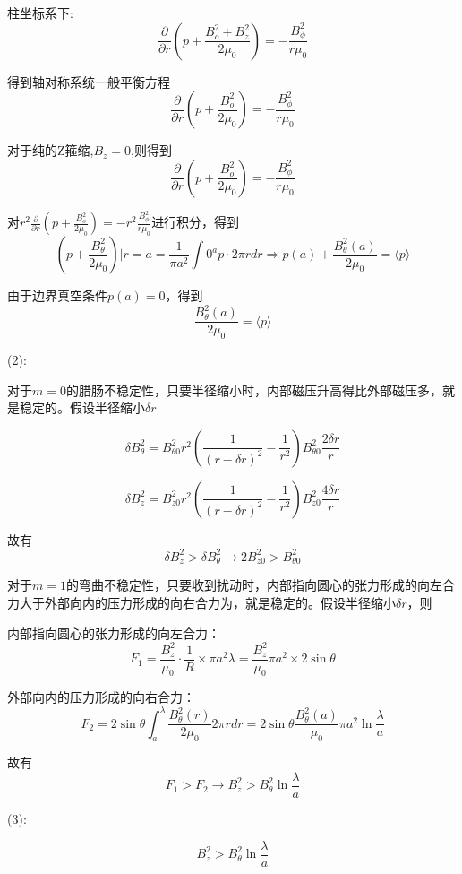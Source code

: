 \documentclass{article}
\begin{document}
柱坐标系下:$$\frac{\partial}{\partial r}\left(p+\frac{B_o^2+B_z^2}{2\mu_0}\right)=-\frac{B_{\phi}^2}{r\mu_0}$$

得到轴对称系统一般平衡方程$$\frac{\partial}{\partial r}\left(p+\frac{B_o^2}{2\mu_0}\right)=-\frac{B_{\phi}^2}{r\mu_0}$$

对于纯的Z箍缩,$B_z=0$,则得到$$\frac{\partial}{\partial r}\left(p+\frac{B_o^2}{2\mu_0}\right)=-\frac{B_{\phi}^2}{r\mu_0}$$

对$r^2\frac{\partial}{\partial r}\left(p+\frac{B_o^2}{2\mu_0}\right)=-r^2\frac{B_{\phi}^2}{r\mu_0}$进行积分，得到$$\left(p+\frac{B_{\theta}^{2}}{2\mu_0}\right){|r=a}=\frac{1}{\pi a^2}\int{0}^{a}p \cdot 2\pi rdr \Rightarrow p(a)+\frac{B_{\theta}^{2}(a)}{2\mu_0}=\langle p\rangle$$

由于边界真空条件$p(a)=0$，得到$$\frac{B_{\theta}^{2}(a)}{2\mu_0}=\langle p\rangle$$

(2):

对于$m=0$的腊肠不稳定性，只要半径缩小时，内部磁压升高得比外部磁压多，就是稳定的。假设半径缩小$\delta r$

$$\delta B_\theta^2 = B_{\theta 0}^2 r^2 \left( \frac{1}{(r - \delta r)^2} - \frac{1}{r^2} \right) B_{\theta 0}^2 \frac{2\delta r}{r} $$

$$\delta B_z^2 = B_{z 0}^2 r^2 \left( \frac{1}{(r - \delta r)^2} - \frac{1}{r^2} \right) B_{z 0}^2 \frac{4\delta r}{r} $$

故有$$\delta B_z^2 > \delta B_\theta^2 \rightarrow 2B_{z 0}^2 > B_{\theta 0}^2$$

对于$m=1$的弯曲不稳定性，只要收到扰动时，内部指向圆心的张力形成的向左合力大于外部向内的压力形成的向右合力为，就是稳定的。假设半径缩小$\delta r$，则

内部指向圆心的张力形成的向左合力：$$F_1 = \frac{B_z^2}{\mu_0} \cdot \frac{1}{R} \times \pi a^2 \lambda = \frac{B_z^2}{\mu_0} \pi a^2 \times 2\sin\theta$$

外部向内的压力形成的向右合力：$$F_2 = 2\sin\theta \int_a^\lambda \frac{B_\theta^2(r)}{2\mu_0} 2\pi r dr = 2\sin\theta \frac{B_\theta^2(a)}{\mu_0} \pi a^2 \ln\frac{\lambda}{a}$$

故有$$F_1 > F_2 \rightarrow B_z^2 > B_\theta^2 \ln\frac{\lambda}{a}$$

(3):

$$B_z^2 > B_\theta^2 \ln\frac{\lambda}{a}$$
\end{document}
